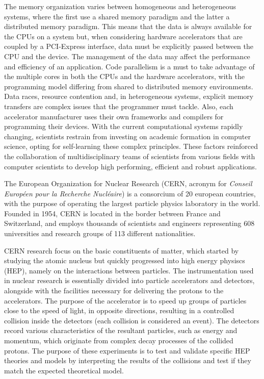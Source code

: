 The memory organization varies between homogeneous and heterogeneous systems, where the first use a shared memory paradigm and the latter a distributed memory paradigm. This means that the data is always available for the CPUs on a system but, when considering hardware accelerators that are coupled by a PCI-Express interface, data must be explicitly passed between the CPU and the device. The management of the data may affect the performance and efficiency of an application. Code parallelism is a must to take advantage of the multiple cores in both the CPUs and the hardware accelerators, with the programming model differing from shared to distributed memory environments. Data races, resource contention and, in heterogeneous systems, explicit memory transfers are complex issues that the programmer must tackle. Also, each accelerator manufacturer uses their own frameworks and compilers for programming their devices. With the current computational systems rapidly changing, scientists restrain from investing on academic formation in computer science, opting for self-learning these complex principles. These factors reinforced the collaboration of multidisciplinary teams of scientists from various fields with computer scientists to develop high performing, efficient and robust applications.

The European Organization for Nuclear Research \cite{CERN} (CERN, acronym for \textit{Conseil Européen pour la Recherche Nucléaire}) is a consorcium of 20 european countries, with the purpose of operating the largest particle physics laboratory in the world. Founded in 1954, CERN is located in the border between France and Switzerland, and employs thousands of scientists and engineers representing 608 universities and research groups of 113 different nationalities.

CERN research focus on the basic constituents of matter, which started by studying the atomic nucleus but quickly progressed into high energy physiscs (HEP), namely on the interactions between particles. The instrumentation used in nuclear research is essentially divided into particle accelerators and detectors, alongside with the facilities necessary for delivering the protons to the accelerators. The purpose of the accelerator is to speed up groups of particles close to the speed of light, in opposite directions, resulting in a controlled collision inside the detectors (each collision is considered an event). The detectors record various characteristics of the resultant particles, such as energy and momentum, which originate from complex decay processes of the collided protons. The purpose of these experiments is to test and validate specific HEP theories and models by interpreting the results of the collisions and test if they match the expected theoretical model.

